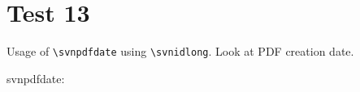 \documentclass[12pt]{report}
\begin{document}
\chapter{Test 13}
Usage of \verb+\svnpdfdate+ using \verb+\svnidlong+.
Look at PDF creation date.

svnpdfdate: \svnpdfdate
\end{document}
